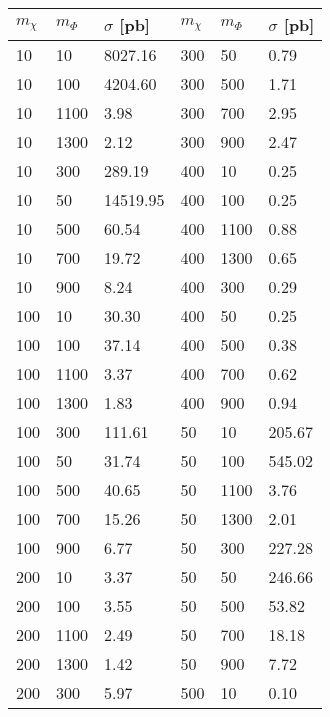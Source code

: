 \begin{table}[h]
\centering
{}
\begin{tabular}{lll||lll}
\hline \hline
$m_\chi $  & $m_\Phi$ & $\sigma$ [pb] & $m_\chi $  & $m_\Phi$ & $\sigma$ [pb]\\ \hline
10  & 10   & 8027.16  & 300 & 50   & 0.79   \\ \hline
10  & 100  & 4204.60  & 300 & 500  & 1.71   \\ \hline
10  & 1100 & 3.98     & 300 & 700  & 2.95   \\ \hline
10  & 1300 & 2.12     & 300 & 900  & 2.47   \\ \hline
10  & 300  & 289.19   & 400 & 10   & 0.25   \\ \hline
10  & 50   & 14519.95 & 400 & 100  & 0.25   \\ \hline
10  & 500  & 60.54    & 400 & 1100 & 0.88   \\ \hline
10  & 700  & 19.72    & 400 & 1300 & 0.65   \\ \hline
10  & 900  & 8.24     & 400 & 300  & 0.29   \\ \hline
100 & 10   & 30.30    & 400 & 50   & 0.25   \\ \hline
100 & 100  & 37.14    & 400 & 500  & 0.38   \\ \hline
100 & 1100 & 3.37     & 400 & 700  & 0.62   \\ \hline
100 & 1300 & 1.83     & 400 & 900  & 0.94   \\ \hline
100 & 300  & 111.61   & 50  & 10   & 205.67 \\ \hline
100 & 50   & 31.74    & 50  & 100  & 545.02 \\ \hline
100 & 500  & 40.65    & 50  & 1100 & 3.76   \\ \hline
100 & 700  & 15.26    & 50  & 1300 & 2.01   \\ \hline
100 & 900  & 6.77     & 50  & 300  & 227.28 \\ \hline
200 & 10   & 3.37     & 50  & 50   & 246.66 \\ \hline
200 & 100  & 3.55     & 50  & 500  & 53.82  \\ \hline
200 & 1100 & 2.49     & 50  & 700  & 18.18  \\ \hline
200 & 1300 & 1.42     & 50  & 900  & 7.72   \\ \hline
200 & 300  & 5.97     & 500 & 10   & 0.10   \\ \hline

\end{tabular}
\end{table}
